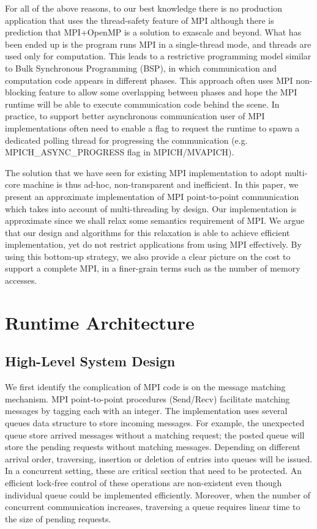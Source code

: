 \documentclass[11pt]{article}
\begin{document}
For all of the above reasons, to our best knowledge there is no production
application that uses the thread-safety feature of MPI although there is
prediction that MPI+OpenMP is a solution to exascale and beyond. What has been
ended up is the program runs MPI in a single-thread mode, and
threads are used only for computation. This leads to a restrictive
programming model similar to Bulk Synchronous Programming (BSP), in which
communication and computation code appears in different phases. This approach
often uses MPI non-blocking feature to allow some overlapping between phases
and hope the MPI runtime will be able to execute communication code behind the
scene. In practice, to support better asynchronous communication user of MPI
implementations often need to enable a flag to request the runtime to spawn a
dedicated polling thread for progressing the communication (e.g.
MPICH_ASYNC_PROGRESS flag in MPICH/MVAPICH).

The solution that we have seen for existing MPI implementation to adopt
multi-core machine is thus ad-hoc, non-transparent and inefficient. In this
paper, we present an approximate implementation of MPI point-to-point
communication which takes into account of multi-threading by design. Our
implementation is approximate since we shall relax some semantics requirement
of MPI. We argue that our design and algorithms for this relaxation is able to
achieve efficient implementation, yet do not restrict applications from using
MPI effectively. By using this bottom-up strategy, we also provide a clear
picture on the cost to support a complete MPI, in a finer-grain terms
such as the number of memory accesses.

\section{Runtime Architecture}
\subsection{High-Level System Design}
We first identify the complication of MPI code is on the message matching
mechanism. MPI point-to-point procedures (Send/Recv) facilitate matching
messages by tagging each with an integer. The implementation uses several
queues data structure to store incoming messages. For example, the unexpected
queue store arrived messages without a matching request; the posted queue
will store the pending requests without matching messages. Depending on
different arrival order, traversing, insertion or deletion of entries into
queues will be issued. In a concurrent setting, these are critical section that
need to be protected. An efficient lock-free control of these operations are
non-existent even though individual queue could be implemented efficiently.
Moreover, when the number of concurrent communication increases, traversing a
queue requires linear time to the size of pending requests.
\end{document}
